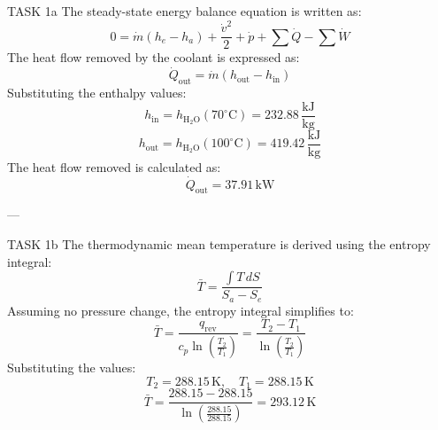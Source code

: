 TASK 1a  
The steady-state energy balance equation is written as:  
\[
0 = \dot{m}(h_e - h_a) + \frac{\dot{v}^2}{2} + \dot{p} + \sum \dot{Q} - \sum \dot{W}
\]  
The heat flow removed by the coolant is expressed as:  
\[
\dot{Q}_{\text{out}} = \dot{m}(h_{\text{out}} - h_{\text{in}})
\]  
Substituting the enthalpy values:  
\[
h_{\text{in}} = h_{\text{H}_2\text{O}}(70^\circ\text{C}) = 232.88 \, \frac{\text{kJ}}{\text{kg}}
\]  
\[
h_{\text{out}} = h_{\text{H}_2\text{O}}(100^\circ\text{C}) = 419.42 \, \frac{\text{kJ}}{\text{kg}}
\]  
The heat flow removed is calculated as:  
\[
\dot{Q}_{\text{out}} = 37.91 \, \text{kW}
\]  

---

TASK 1b  
The thermodynamic mean temperature is derived using the entropy integral:  
\[
\bar{T} = \frac{\int T \, dS}{S_a - S_e}
\]  
Assuming no pressure change, the entropy integral simplifies to:  
\[
\bar{T} = \frac{q_{\text{rev}}}{c_p \ln \left( \frac{T_2}{T_1} \right)} = \frac{T_2 - T_1}{\ln \left( \frac{T_2}{T_1} \right)}
\]  
Substituting the values:  
\[
T_2 = 288.15 \, \text{K}, \quad T_1 = 288.15 \, \text{K}
\]  
\[
\bar{T} = \frac{288.15 - 288.15}{\ln \left( \frac{288.15}{288.15} \right)} = 293.12 \, \text{K}
\]  

